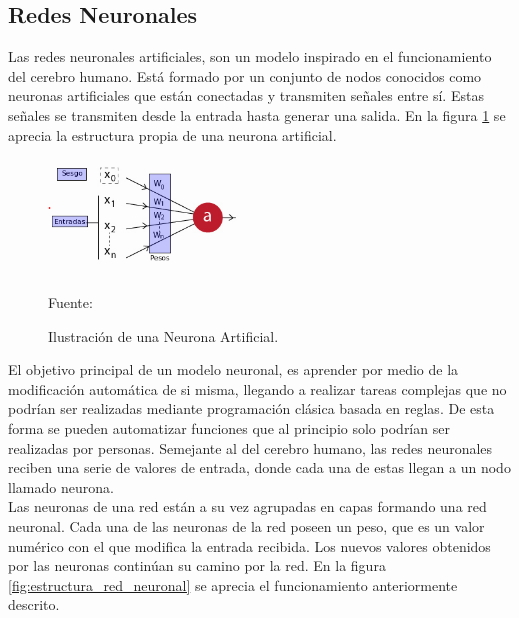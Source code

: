 
\subsection{Redes Neuronales}
Las redes neuronales artificiales, son un modelo inspirado en el funcionamiento del cerebro humano. Está formado por un conjunto de nodos conocidos como neuronas artificiales que están conectadas y transmiten señales entre sí. Estas señales se transmiten desde la entrada hasta generar una salida. En la figura \ref{fig:classical_ml} se aprecia la estructura propia de una neurona artificial.\\

\begin{figure}[H]
    \begin{center}
        \includegraphics[width=5.5cm]{img/capitulo_2/neurona.png}
        \caption{Ilustración de una Neurona Artificial.}
        Fuente: \cite{tensorflow_neurona}
    \label{fig:classical_ml}
    \end{center}
\end{figure}

El objetivo principal de un modelo neuronal, es aprender por medio de la modificación automática de si misma, llegando a realizar tareas complejas que no podrían ser realizadas mediante programación clásica basada en reglas. De esta forma se pueden automatizar funciones que al principio solo podrían ser realizadas por personas. Semejante al del cerebro humano, las redes neuronales reciben una serie de valores de entrada, donde cada una de estas llegan a un nodo llamado neurona.\\

Las neuronas de una red están a su vez agrupadas en capas formando una red neuronal. Cada una de las neuronas de la red poseen un peso, que es un valor numérico con el que modifica la entrada recibida. Los nuevos valores obtenidos por las neuronas continúan su camino por la red. En la figura \ref{fig:estructura_red_neuronal} se aprecia el funcionamiento anteriormente descrito.\\

